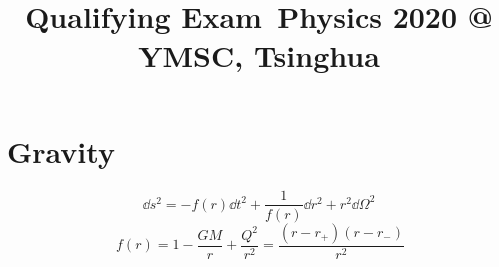 \documentclass[a4paper
	,10pt
]{article}
\title{Qualifying Exam\phantom{:}%
	\,\normalsize Physics 2020 @ YMSC, Tsinghua%
}
\begin{document}
\maketitle
{}
\thispagestyle{empty}

\section{Gravity}
	\vspace{-1.5\baselineskip}
	\begin{equation}
		\dd{s^2}
		= - f(r) \dd{t^2}
			+ \frac{1}{f(r)} \dd{r^2}
			+ r^2 \dd{\Omega^2}
	\end{equation}
	\vspace{-.3\baselineskip}
	\begin{equation}
		\ f(r)
		= 1 - \frac{GM}{r} + \frac{Q^2}{r^2}
		= \frac{(r - r_+)(r - r_-)}{r^2}
	\end{equation}
	
\end{document}
